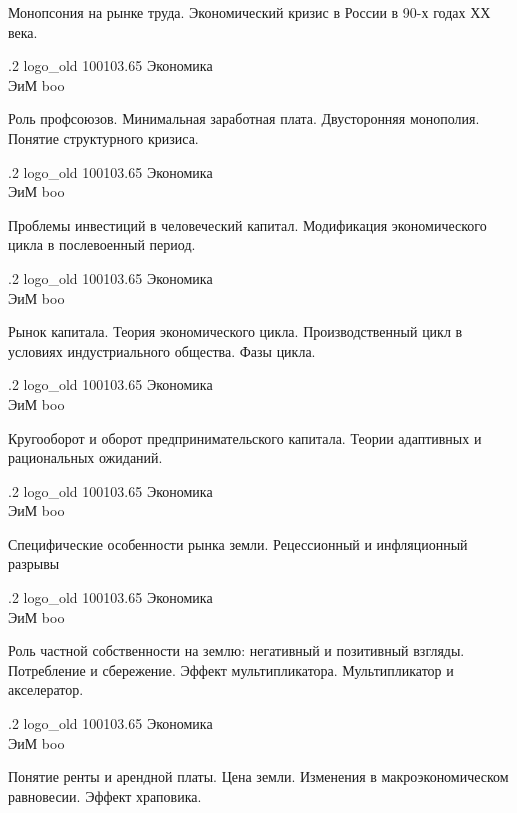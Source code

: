 \documentclass[
	12pt,
	a4paper,
	]
	{article}
\newcommand{\shapkFull}{
	\shapk
		{.2}
		{logo_old}
		{100103.65}
		{Экономика\\}
		{ЭиМ}
		{boo}
}
\begin{document}
\z 	Монопсония на рынке труда.
 \medskip
\z 	Экономический кризис в России в 90-х годах ХХ века.
 \medskip

\newpage


\shapkFull
\setcounter{zad}{0}

\z 	Роль профсоюзов. Минимальная заработная плата.  Двусторонняя монополия.
 \medskip
\z 	Понятие структурного кризиса.
 \medskip

\newpage


\shapkFull
\setcounter{zad}{0}

\z 	Проблемы инвестиций в человеческий капитал.
 \medskip
\z 	Модификация экономического цикла в послевоенный период.
 \medskip

\newpage


\shapkFull
\setcounter{zad}{0}

\z 	 Рынок капитала.
 \medskip
\z 	Теория экономического цикла. Производственный цикл в условиях индустриального общества. Фазы цикла.
 \medskip

\newpage


\shapkFull
\setcounter{zad}{0}

\z 	Кругооборот и оборот предпринимательского капитала.
 \medskip
\z 	Теории адаптивных и рациональных ожиданий. 
 \medskip

\newpage


\shapkFull
\setcounter{zad}{0}

\z 	Специфические особенности рынка земли.
 \medskip
\z 	Рецессионный и инфляционный разрывы
 \medskip

\newpage


\shapkFull
\setcounter{zad}{0}

\z 	Роль частной собственности на землю: негативный и позитивный взгляды.
 \medskip
\z 	Потребление и сбережение. Эффект мультипликатора. Мультипликатор и акселератор.
 \medskip

\newpage


\shapkFull
\setcounter{zad}{0}

\z 	Понятие ренты и арендной платы. Цена земли.
 \medskip
\z 	Изменения в макроэкономическом равновесии.  Эффект храповика.
 \medskip
\end{document}
